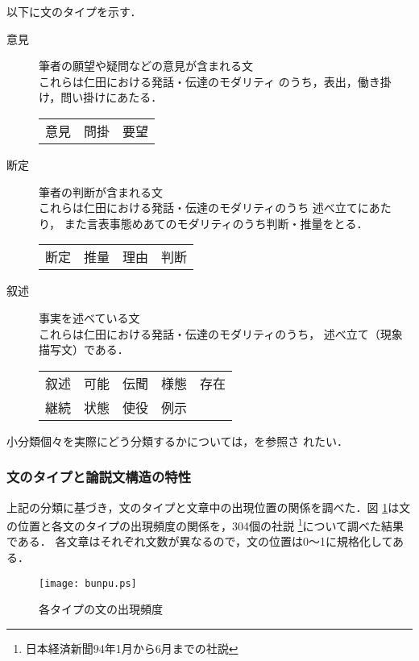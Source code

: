以下に文のタイプを示す．
\begin{description}
 \item[意見] 筆者の願望や疑問などの意見が含まれる文\\
	これらは仁田\cite{Nitta:91}における発話・伝達のモダリティ
	のうち，表出，働き掛け，問い掛けにあたる．
\begin{center}
\begin{tabular}{lll}
 意見 & 問掛 & 要望 \\
 \end{tabular}
\end{center}
 \item[断定] 筆者の判断が含まれる文\\
	これらは仁田\cite{Nitta:91}における発話・伝達のモダリティのうち
	述べ立てにあたり，
	また言表事態めあてのモダリティのうち判断・推量をとる．
 \begin{center}
  \begin{tabular}{llll}
  断定 & 推量 & 理由 & 判断\\
\end{tabular}
\end{center}

 \item[叙述] 事実を述べている文\\
	これらは仁田\cite{Nitta:91}における発話・伝達のモダリティのうち，
	述べ立て（現象描写文）である．
\begin{center}
 \begin{tabular}{lllll}
  叙述 & 可能 & 伝聞 & 様態 & 存在 \\
  継続 & 状態 & 使役 & 例示 \\
  \end{tabular}
\end{center}
\end{description}

小分類個々を実際にどう分類するかについては，\cite{Fukumoto:91}を参照さ
れたい．

\subsubsection{文のタイプと論説文構造の特性}

上記の分類に基づき，文のタイプと文章中の出現位置の関係を調べた．図
\ref{bunpu}は文の位置と各文のタイプの出現頻度の関係を，304個の社説
\footnote{日本経済新聞94年1月から6月までの社説}について調べた結果である．
各文章はそれぞれ文数が異なるので，文の位置は0〜1に規格化してある．

\begin{figure}[htbp]
\begin{center}
\texttt{[image: bunpu.ps]}
\caption{各タイプの文の出現頻度}\label{bunpu}
\end{center}
\end{figure}

